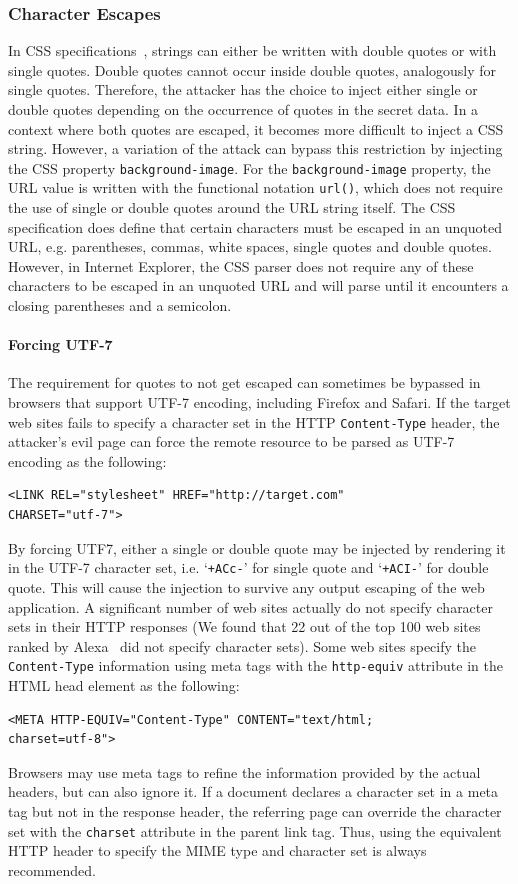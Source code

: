 \documentclass{acm_proc_article-sp}
\begin{document}
\subsubsection{Character Escapes}
In CSS specifications~\cite{css}, strings can either be written with double quotes or with single quotes. Double quotes cannot occur inside double quotes, analogously for single quotes. Therefore, the attacker has the choice to inject either single or double quotes depending on the occurrence of quotes in the secret data. In a context where both quotes are escaped, it becomes more difficult to inject a CSS string. However, a variation of the attack  can bypass this restriction by injecting the CSS property \texttt{background-image}. For the \texttt{background-image} property, the URL value is written with the functional notation \texttt{url()}, which does not require the use of single or double quotes around the URL string itself. The CSS specification does define that certain characters must be escaped in an unquoted URL, e.g. parentheses, commas, white spaces, single quotes and double quotes. However, in Internet Explorer, the CSS parser does not require any of these characters to be escaped in an unquoted URL and will parse until it encounters a closing parentheses and a semicolon.

\paragraph{Forcing UTF-7}
The requirement for quotes to not get escaped can sometimes be bypassed in browsers that support UTF-7 encoding, including Firefox and Safari. If the target web sites fails to specify a character set in the HTTP \texttt{Content-Type} header, the attacker's evil page can force the remote resource to be parsed as UTF-7 encoding as the following:
\begin{verbatim}
<LINK REL="stylesheet" HREF="http://target.com"
CHARSET="utf-7">
\end{verbatim}
By forcing UTF7, either a single or double quote may be injected by rendering it in the UTF-7 character set, i.e. `\texttt{+ACc-}' for single quote and `\texttt{+ACI-}' for double quote. This will cause the injection to survive any output escaping of the web application. A significant number of web sites actually do not specify character sets in their HTTP responses (We found that 22 out of the top 100 web sites ranked by Alexa~\cite{alexa} did not specify character sets). Some web sites specify the \texttt{Content-Type} information using meta tags with the \texttt{http-equiv} attribute in the HTML head element as the following:
\begin{verbatim}
<META HTTP-EQUIV="Content-Type" CONTENT="text/html;
charset=utf-8">
\end{verbatim}
Browsers may use meta tags to refine the information provided by the actual headers, but can also ignore it. If a document declares a character set in a meta tag but not in the response header, the referring page can override the character set with the \texttt{charset} attribute in the parent link tag. Thus, using the equivalent HTTP header to specify the MIME type and character set is always recommended.
\end{document}
